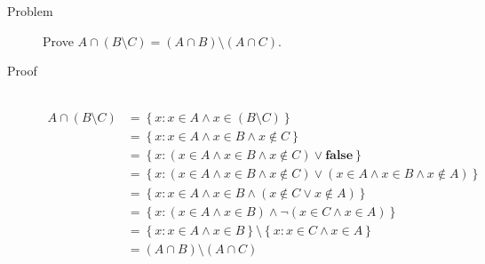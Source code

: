 \begin{description}
\item[Problem]
Prove $A \cap (B \setminus C) = (A \cap B) \setminus (A \cap C)$.

\item[Proof]~\\
\begin{equation*}
\begin{aligned}
A \cap (B \setminus C)
        &= \left\{ x : x \in A \land x \in (B \setminus C)\right\} \\
        &= \left\{ x : x \in A \land x \in B \land x \not \in C\right\} \\
        &= \left\{ x : (x \in A \land x \in B \land x \not \in C) \lor
           \mathbf{false}\right\} \\
        &= \left\{ x : (x \in A \land x \in B \land x \not \in C) \lor
           (x \in A \land x \in B \land x \not \in A)\right\} \\
        &= \left\{ x : x \in A \land x \in B \land (x \not \in C \lor x \not
           \in A) \right\} \\
        &= \left\{ x : (x \in A \land x \in B) \land \neg (x \in C \land x \in
           A) \right\} \\
        &= \left\{ x : x \in A \land x \in B \right\} \setminus 
           \left\{ x : x \in C \land x \in A \right\} \\
        &= (A \cap B) \setminus (A \cap C)
\end{aligned}
\end{equation*}

\end{description}
